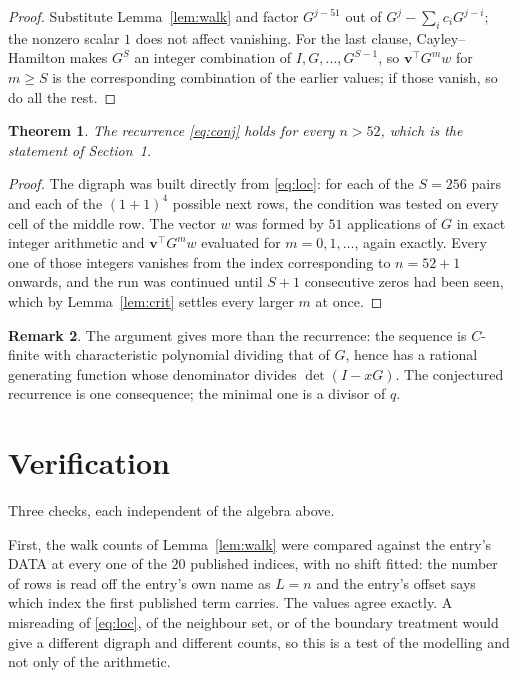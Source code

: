 \documentclass[11pt,a4paper]{article}
\theoremstyle{plain}
\newtheorem{theorem}{Theorem}
\theoremstyle{definition}
\newtheorem{remark}[theorem]{Remark}
\begin{document}
\begin{proof}
Substitute Lemma~\ref{lem:walk} and factor $G^{j-51}$ out of
$G^{j}-\sum_ic_iG^{j-i}$; the nonzero scalar $1$ does not affect
vanishing. For the last clause, Cayley--Hamilton makes $G^{S}$ an integer combination of
$I,G,\dots,G^{S-1}$, so $\mathbf{v}^{\!\top}G^{m}w$ for $m\ge S$ is the corresponding
combination of the earlier values; if those vanish, so do all the rest.
\end{proof}

\begin{theorem}
The recurrence \eqref{eq:conj} holds for every $n>52$, which is the statement of
Section~1.
\end{theorem}

\begin{proof}
The digraph was built directly from \eqref{eq:loc}: for each of the $S=256$ pairs and each
of the $(1+1)^{4}$ possible next rows, the condition was tested on every cell of
the middle row. The vector $w$ was formed by $51$ applications of $G$ in exact integer
arithmetic and $\mathbf{v}^{\!\top}G^{m}w$ evaluated for $m=0,1,\dots$, again exactly.
Every one of those integers vanishes from the index corresponding to $n=52+1$ onwards,
and the run was continued until $S+1$ consecutive zeros had been seen, which by
Lemma~\ref{lem:crit} settles every larger $m$ at once.
\end{proof}

\begin{remark}
The argument gives more than the recurrence: the sequence is $C$-finite with characteristic
polynomial dividing that of $G$, hence has a rational generating function whose denominator
divides $\det(I-xG)$. The conjectured recurrence is one consequence; the minimal one is a
divisor of $q$.
\end{remark}

\section{Verification}

Three checks, each independent of the algebra above.

First, the walk counts of Lemma~\ref{lem:walk} were compared against the entry's DATA at
every one of the $20$ published indices, with no shift fitted: the number of rows is
read off the entry's own name as $L=n$ and the entry's offset says which index the first
published term carries. The values agree exactly. A misreading of \eqref{eq:loc}, of the
neighbour set, or of the boundary treatment would give a different digraph and different
counts, so this is a test of the modelling and not only of the arithmetic.
\end{document}

